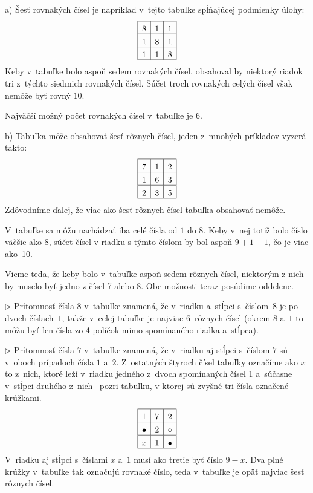 {%
a) Šesť rovnakých čísel je napríklad v~tejto
tabuľke spĺňajúcej podmienky úlohy:
$$
\vbox{\def\pol#1{\hbox to 15 bp{\hss#1\hss}\vrule}%
\halign{\vrule height12bp depth 3bp\pol#&&\pol#\cr
\noalign{\hrule}
8 & 1 & 1 \cr\noalign{\hrule}
1 & 8 & 1 \cr\noalign{\hrule}
1 & 1 & 8 \cr\noalign{\hrule}
}}
$$
Keby v~tabuľke bolo aspoň sedem rovnakých čísel, obsahoval by
niektorý riadok tri z~týchto siedmich rovnakých čísel. Súčet troch
rovnakých celých čísel však nemôže byť rovný $10$.

\zaver
Najväčší možný počet rovnakých čísel v~tabuľke je 6.


\smallskip
b) Tabuľka môže obsahovať šesť rôznych čísel, jeden z~mnohých
príkladov
vyzerá takto:
$$
\vbox{\def\pol#1{\hbox to 15 bp{\hss#1\hss}\vrule}%
\halign{\vrule height12bp depth 3bp\pol#&&\pol#\cr
\noalign{\hrule}
7 & 1 & 2 \cr\noalign{\hrule}
1 & 6 & 3 \cr\noalign{\hrule}
2 & 3 & 5 \cr\noalign{\hrule}
}}
$$
Zdôvodníme ďalej, že viac ako šesť rôznych čísel tabuľka obsahovať
nemôže.

V~tabuľke sa môžu nachádzať iba celé čísla od $1$ do $8$.
Keby v~nej totiž bolo číslo väčšie ako 8,
súčet čísel v riadku s týmto číslom by bol aspoň
$9+1+1$, čo je viac ako~10.

Vieme teda, že keby bolo v~tabuľke aspoň sedem rôznych čísel,
niektorým z nich by muselo byť jedno z čísel 7 alebo 8. Obe
možnosti teraz posúdime oddelene.

\smallskip
\item{$\triangleright$} Prítomnosť čísla 8 v~tabuľke znamená, že
v~riadku a~stĺpci s~číslom~$8$
je po dvoch číslach~$1$, takže v~celej tabuľke je
najviac 6~rôznych čísel (okrem $8$ a~$1$ to môžu byť
len čísla zo 4 políčok mimo spomínaného riadka a~stĺpca).

\item{$\triangleright$} Prítomnosť čísla $7$ v~tabuľke znamená, že
v~riadku aj stĺpci s~číslom $7$ sú v~oboch prípadoch čísla
$1$ a~$2$.
Z~ostatných štyroch čísel tabuľky označíme ako $x$
to z~nich, ktoré leží v~riadku jedného z~dvoch spomínaných čísel 1
a~súčasne v~stĺpci druhého z~nich-- pozri tabuľku, v ktorej
sú zvyšné tri čísla označené krúžkami.
$$\vbox{\def\pol#1{\hbox to 15 bp{\hss$#1$\hss}\vrule}%
\halign{\vrule height12bp depth 3bp\pol#&&\pol#\cr
\noalign{\hrule}
1 & 7 & 2 \cr\noalign{\hrule}
{\bullet} & 2 & \circ \cr\noalign{\hrule}
x & 1 & {\bullet} \cr\noalign{\hrule}
}}$$
V~riadku aj stĺpci s~číslami $x$ a~$1$ musí ako tretie byť číslo $9-x$.
Dva plné krúžky v~tabuľke tak označujú
rovnaké číslo, teda v~tabuľke je opäť najviac šesť rôznych čísel.

}
